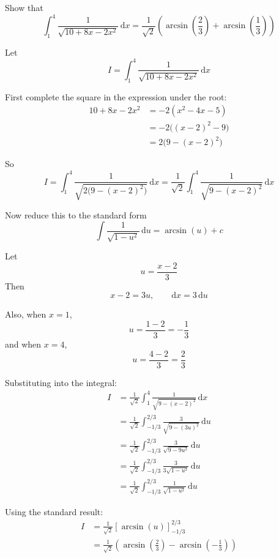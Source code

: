 \documentclass[leqno]{article}
\begin{document}
\begin{enumerate}[
  label=\textbf{\arabic*.},
  leftmargin=*,
  topsep=0pt,
  partopsep=0pt,
  parsep=0pt
]
Show that
\[
\int_{1}^{4} \frac{1}{\sqrt{10 + 8x - 2x^2}}\,\mathrm{d}x = \frac{1}{\sqrt{2}}\left(\arcsin \left(\frac{2}{3}\right) + \arcsin \left(\frac{1}{3}\right)\right)
\]

\vspace*{30pt}

\begin{tcolorbox}[colback=white, colframe=scarlet, title={\textbf{Solution}}, breakable, grow to left by=6mm, grow to right by=10mm]
Let
\[
I=\int_{1}^{4}\frac{1}{\sqrt{10+8x-2x^2}}\,\mathrm{d}x
\]

First complete the square in the expression under the root:
\begin{align*}
10+8x-2x^2
&=-2(x^2-4x-5)\\
&=-2\bigl((x-2)^2-9\bigr)\\
&=2\bigl(9-(x-2)^2\bigr)
\end{align*}

So
\[
I=\int_{1}^{4}\frac{1}{\sqrt{2\bigl(9-(x-2)^2\bigr)}}\,\mathrm{d}x
=\frac{1}{\sqrt{2}}\int_{1}^{4}\frac{1}{\sqrt{9-(x-2)^2}}\,\mathrm{d}x
\]

Now reduce this to the standard form
\[
\int \frac{1}{\sqrt{1-u^2}}\,\mathrm{d}u=\arcsin (u)+c
\]

Let
\[
u=\frac{x-2}{3}
\]
Then
\[
x-2=3u,\qquad \mathrm{d}x=3\,\mathrm{d}u
\]

Also, when $x=1$,
\[
u=\frac{1-2}{3}=-\frac13
\]
and when $x=4$,
\[
u=\frac{4-2}{3}=\frac23
\]

Substituting into the integral:
\begin{align*}
I
&=\frac{1}{\sqrt{2}}\int_{1}^{4}\frac{1}{\sqrt{9-(x-2)^2}}\,\mathrm{d}x\\
&=\frac{1}{\sqrt{2}}\int_{-1/3}^{2/3}\frac{3}{\sqrt{9-(3u)^2}}\,\mathrm{d}u\\
&=\frac{1}{\sqrt{2}}\int_{-1/3}^{2/3}\frac{3}{\sqrt{9-9u^2}}\,\mathrm{d}u\\
&=\frac{1}{\sqrt{2}}\int_{-1/3}^{2/3}\frac{3}{3\sqrt{1-u^2}}\,\mathrm{d}u\\
&=\frac{1}{\sqrt{2}}\int_{-1/3}^{2/3}\frac{1}{\sqrt{1-u^2}}\,\mathrm{d}u
\end{align*}

Using the standard result:
\begin{align*}
I
&=\frac{1}{\sqrt{2}}\left[\arcsin (u)\right]_{-1/3}^{2/3}\\
&=\frac{1}{\sqrt{2}}\left(\arcsin \left(\frac23\right)-\arcsin \left(-\frac13\right)\right)
\end{align*}


\end{tcolorbox}
\end{enumerate}
\end{document}

